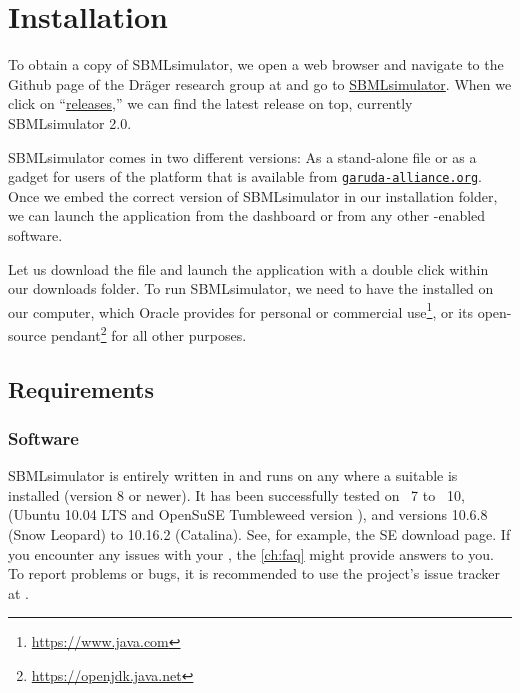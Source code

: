 
\chapter{Installation}

To obtain a copy of SBMLsimulator, we open a web browser and navigate to the Github page of the Dräger research group at  and go to \href{https://github.com/draeger-lab/SBMLsimulator/}{SBMLsimulator}. When we click on ``\href{https://github.com/draeger-lab/SBMLsimulator/releases/}{releases},'' we can find the latest release on top, currently SBMLsimulator 2.0.

SBMLsimulator comes in two different versions: As a stand-alone \JAR file or as a gadget for users of the \Garuda platform that is available from \href{http://garuda-alliance.org}{\texttt{garuda-alliance.org}}.
Once we embed the correct version of SBMLsimulator in our \Garuda installation folder, we can launch the application from the \Garuda dashboard or from any other \Garuda-enabled software.

Let us download the \JAR file and launch the application with a double click within our downloads folder.
To run SBMLsimulator, we need to have the \JVM installed on our computer, which Oracle provides for personal or commercial use\footnote{\url{https://www.java.com}}, or its open-source pendant\footnote{\url{https://openjdk.java.net}\label{fn:jvmldl}} for all other purposes.

\section{Requirements}
\subsection{Software}

SBMLsimulator is entirely written in \Java and runs on any \OS
where a suitable \JVM is installed (\JDK version 8 or newer).
It has been successfully tested on \Windows~7 to \Windows~10, \Linux (Ubuntu 10.04 LTS and OpenSuSE Tumbleweed version ), and \MacOSX versions 10.6.8 (Snow Leopard) to 10.16.2 (Catalina).
See, for example, the \Java SE download
page.
If you encounter any issues with your \OS, the \cref{ch:faq} might provide answers to you.
To report problems or bugs, it is recommended to use the project's issue tracker at .


